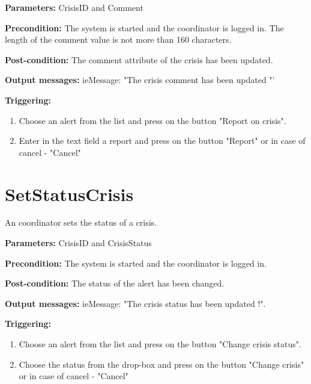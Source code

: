 \begin{description}
	\item \textbf{Parameters:} CrisisID and Comment
	\item \textbf{Precondition:} The system is started and the coordinator is
	logged in. The length of the comment value is not more than 160 characters.
	\item \textbf{Post-condition:} The comment attribute of the crisis has been
	updated.
	\item \textbf{Output messages:} ieMessage: "The crisis comment has
	been updated "'
	
	\item \textbf{Triggering:}
	
	\begin{enumerate}
		\item Choose an alert from the list and press on the button "Report on crisis".
		\item Enter in the text field a report and press on the button "Report" or in case of cancel - "Cancel"
	\end{enumerate}
\end{description}

\section{SetStatusCrisis}
\label{operation:SetStatusCrisis}

An coordinator sets the status of a crisis.

\begin{description}
	\item \textbf{Parameters:} CrisisID and CrisisStatus
	\item \textbf{Precondition:} The system is started and the coordinator is
	logged in.
	\item \textbf{Post-condition:} The status of the alert has been changed.
	\item \textbf{Output messages:} ieMessage: "The crisis status has been updated !".
	
	\item \textbf{Triggering:}
	
	\begin{enumerate}
		\item Choose an alert from the list and press on the button "Change crisis
		status".
		\item Choose the status from the drop-box and press on the button "Change
		crisis" or in case of cancel - "Cancel"
	\end{enumerate}
\end{description}

